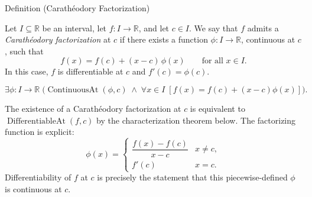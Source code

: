 
\begin{definitionbox}{Definition (Carathéodory Factorization)}
\begin{definition}
\label{def:caratheodory-factorization}
Let $I \subseteq \mathbb{R}$ be an interval, let $f : I \to \mathbb{R}$, and let $c \in I$. We say that $f$ admits a \emph{Carathéodory factorization} at $c$ if there exists a function $\phi : I \to \mathbb{R}$, continuous at $c$, such that
\[
f(x) = f(c) + (x-c)\,\phi(x) \qquad \text{for all } x \in I.
\]
In this case, $f$ is differentiable at $c$ and $f'(c) = \phi(c)$.
\end{definition}
\end{definitionbox}

\begin{remark*}
\[
\exists \phi : I \to \mathbb{R}\;
\bigl(\operatorname{ContinuousAt}(\phi,c)
\;\land\;
\forall x \in I\;[f(x) = f(c)+(x-c)\phi(x)]\bigr).
\]
\end{remark*}

\begin{remark*}
The existence of a Carathéodory factorization at $c$ is equivalent to $\operatorname{DifferentiableAt}(f,c)$ by the characterization theorem below. The factorizing function is explicit:
\[
\phi(x) =
\begin{cases}
\dfrac{f(x)-f(c)}{x-c} & x \neq c, \\[6pt]
f'(c) & x = c.
\end{cases}
\]
Differentiability of $f$ at $c$ is precisely the statement that this piecewise-defined $\phi$ is continuous at $c$.
\end{remark*}

